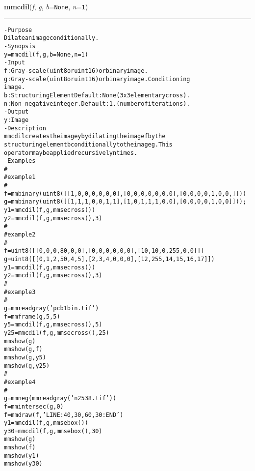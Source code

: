     \begin{boxedminipage}{\textwidth}

    \raggedright \textbf{mmcdil}(\textit{f}, \textit{g}, \textit{b}=\texttt{N\-o\-n\-e\-}, \textit{n}=\texttt{1\-})

    \vspace{-1.5ex}

    \rule{\textwidth}{0.5\fboxrule}
\begin{alltt}
- Purpose
    Dilate an image conditionally.
- Synopsis
    y = mmcdil(f, g, b=None, n=1)
- Input
    f: Gray-scale (uint8 or uint16) or binary image.
    g: Gray-scale (uint8 or uint16) or binary image. Conditioning
       image.
    b: Structuring Element Default: None (3x3 elementary cross).
    n: Non-negative integer. Default: 1. (number of iterations).
- Output
    y: Image
- Description
    mmcdil creates the image y by dilating the image f by the
    structuring element b conditionally to the image g . This
    operator may be applied recursively n times.
- Examples
    \#
    \#   example 1
    \#
    f = mmbinary(uint8([[1, 0, 0, 0, 0, 0, 0],                [0, 0, 0, 0, 0, 0, 0],                [0, 0, 0, 0, 1, 0, 0,]]))
    g = mmbinary(uint8([[1, 1, 1, 0, 0, 1, 1],                [1, 0, 1, 1, 1, 0, 0],                [0, 0, 0, 0, 1, 0, 0]]));
    y1=mmcdil(f,g,mmsecross())
    y2=mmcdil(f,g,mmsecross(),3)
    \#
    \#   example 2
    \#
    f = uint8([                [   0,    0,   0,   80,   0,   0],                [   0,    0,   0,    0,   0,   0],                [  10,   10,   0,  255,   0,   0]])
    g = uint8([                [   0,    1,   2,   50,   4,   5],                [   2,    3,   4,    0,   0,   0],                [  12,  255,  14,   15,  16,  17]])
    y1=mmcdil(f,g,mmsecross())
    y2=mmcdil(f,g,mmsecross(),3)
    \#
    \#   example 3
    \#
    g=mmreadgray('pcb1bin.tif')
    f=mmframe(g,5,5)
    y5=mmcdil(f,g,mmsecross(),5)
    y25=mmcdil(f,g,mmsecross(),25)
    mmshow(g)
    mmshow(g,f)
    mmshow(g,y5)
    mmshow(g,y25)
    \#
    \#   example 4
    \#
    g=mmneg(mmreadgray('n2538.tif'))
    f=mmintersec(g,0)
    f=mmdraw(f,'LINE:40,30,60,30:END')
    y1=mmcdil(f,g,mmsebox())
    y30=mmcdil(f,g,mmsebox(),30)
    mmshow(g)
    mmshow(f)
    mmshow(y1)
    mmshow(y30)\end{alltt}

    \vspace{1ex}

    \end{boxedminipage}

    \label{multireg:num_pymorph:mmcenter}
    \vspace{0.5ex}

